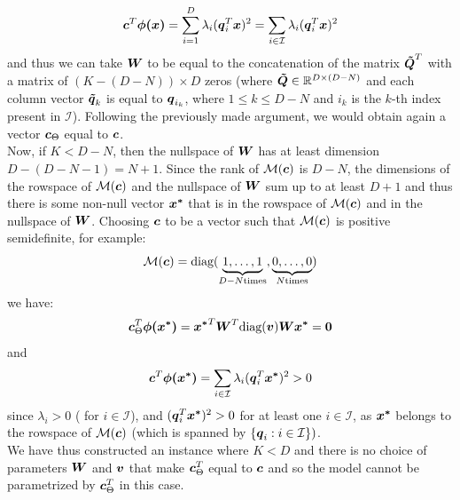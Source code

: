 \documentclass{exam}
\begin{document}
\begin{questions}
        \[
            \vb*{c}^T \vb*{\phi(x)} = \sum_{i = 1}^{D} \lambda_i (\vb*{q}_i^T\vb*{x})^2 = \sum_{i \in \mathcal{I}} \lambda_i (\vb*{q}_i^T\vb*{x})^2
        \]
        and thus we can take $\vb*{W}$ to be equal to the concatenation of the matrix $\vb*{\tilde{Q}}^T$ with a matrix of $(K - (D - N)) \times D$ zeros (where $\vb*{\tilde{Q}} \in \mathbb{R}^{D \times (D - N)}$ and each column vector $\vb*{\tilde{q}}_k$ is equal to $\vb*{q}_{i_k}$, where $1 \le k \le D - N$ and $i_k$ is the $k$-th index present in $\mathcal{I}$). Following the previously made argument, we would obtain again a vector $\vb*{c}_{\Theta}$ equal to $\vb*{c}$. \\
        Now, if $K < D - N$, then the nullspace of $\vb*{W}$ has at least dimension $D - (D - N - 1) = N + 1$. Since the rank of $\mathcal{M}(\vb*{c})$ is $D - N$, the dimensions of the rowspace of $\mathcal{M}(\vb*{c})$ and the nullspace of $\vb*{W}$ sum up to at least $D + 1$ and thus there is some non-null vector $\vb*{x^*}$ that is in the rowspace of $\mathcal{M}(\vb*{c})$ and in the nullspace of $\vb*{W}$. Choosing $\vb*{c}$ to be a vector such that $\mathcal{M}(\vb*{c})$ is positive semidefinite, for example: 
        \[
            \mathcal{M}(\vb*{c}) = \text{diag}(\underbrace{1, \dots, 1}_{D - N \text{times}}, \underbrace{0, \dots, 0}_{N \text{times}}) 
        \]
        we have:
        \[
            \vb*{c}^T_{\Theta} \vb*{\phi(x^*)}
            = \vb*{x^*}^T \vb*{W}^T \text{diag}(\vb*{v}) \vb*{Wx^*} = \vb*{0}
        \]
        and
        \[
            \vb*{c}^T \vb*{\phi(x^*)} = \sum_{i \in \mathcal{I}} \lambda_i (\vb*{q}_i^T\vb*{x^*})^2 > 0
        \]
        since $\lambda_i > 0$ ( for $i \in \mathcal{I}$), and $(\vb*{q}_i^T\vb*{x^*})^2 > 0$ for at least one $i \in \mathcal{I}$, as $\vb*{x^*}$ belongs to the rowspace of $ \mathcal{M}(\vb*{c})$ (which is spanned by $\{\vb*{q}_i : i \in \mathcal{I}\})$.\\
        We have thus constructed an instance where $K < D$ and there is no choice of parameters $\vb*{W}$ and $\vb*{v}$ that make $\vb*{c}^T_{\Theta}$ equal to $\vb*{c}$ and so the model cannot be parametrized by $\vb*{c}^T_{\Theta}$ in this case.


\end{questions}
\end{document}
